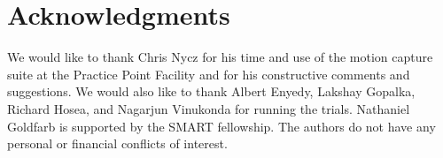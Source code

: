 \section{Acknowledgments}
We would like to thank Chris Nycz for his time and use of the motion capture suite at the Practice Point Facility and for his constructive comments and suggestions. We would also like to thank Albert Enyedy, Lakshay Gopalka, Richard Hosea, and Nagarjun Vinukonda for running the trials. Nathaniel Goldfarb is supported by the SMART fellowship. The authors do not have any personal or financial conflicts of interest.  